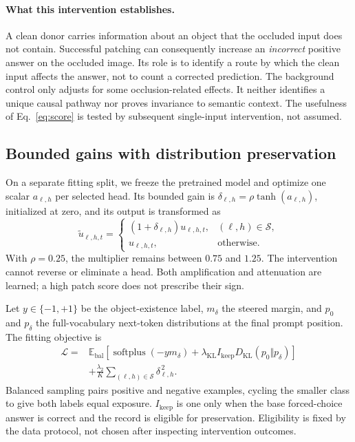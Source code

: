 \paragraph{What this intervention establishes.}
A clean donor carries information about an object that the occluded input
does not contain. Successful patching can consequently increase an
\emph{incorrect} positive answer on the occluded image. Its role is to
identify a route by which the clean input affects the answer, not to count
a corrected prediction. The background control only adjusts for some
occlusion-related effects. It neither identifies a unique causal pathway
nor proves invariance to semantic context. The usefulness of
Eq.~\eqref{eq:score} is tested by subsequent single-input intervention,
not assumed.

\subsection{Bounded gains with distribution preservation}
\label{sec:fit}
On a separate fitting split, we freeze the pretrained model and optimize
one scalar $a_{\ell,h}$ per selected head. Its bounded gain is
$\delta_{\ell,h}=\rho\tanh(a_{\ell,h})$, initialized at zero, and its output
is transformed as
\begin{equation}
 \widetilde u_{\ell,h,t}=
 \begin{cases}
 (1+\delta_{\ell,h})u_{\ell,h,t},
       &(\ell,h)\in\mathcal{S},\\
 u_{\ell,h,t},&\text{otherwise}.
 \end{cases}
 \label{eq:gain}
\end{equation}
With $\rho=0.25$, the multiplier remains between $0.75$ and $1.25$.
The intervention cannot reverse or eliminate a head. Both amplification
and attenuation are learned; a high patch score does not prescribe their
sign.

Let $y\in\{-1,+1\}$ be the object-existence label, $m_\delta$ the steered
margin, and $p_0$ and $p_\delta$ the full-vocabulary next-token distributions
at the final prompt position. The fitting objective is
\begin{equation}
\begin{split}
\mathcal{L}={}&
 \mathbb{E}_{\mathrm{bal}}\left[
 \operatorname{softplus}(-y m_\delta)
 +\lambda_{\mathrm{KL}} I_{\mathrm{keep}}
   D_{\mathrm{KL}}(p_0\Vert p_\delta)\right]\\
 &+\frac{\lambda_2}{K}
   \sum_{(\ell,h)\in\mathcal{S}}\delta_{\ell,h}^{\,2}.
\end{split}
\label{eq:loss}
\end{equation}
Balanced sampling pairs positive and negative examples, cycling the smaller
class to give both labels equal exposure. $I_{\mathrm{keep}}$ is one only
when the base forced-choice answer is correct and the record is eligible
for preservation. Eligibility is fixed by the data protocol, not chosen
after inspecting intervention outcomes.

